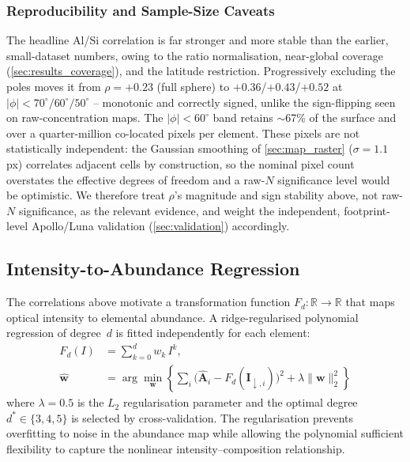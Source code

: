 \documentclass[journal,lettersize]{IEEEtran}
\begin{document}
\subsubsection{Reproducibility and Sample-Size Caveats}\label{sec:sr_correlation_caveat}

The headline Al/Si correlation is far stronger and more stable than the
earlier, small-dataset numbers, owing to the ratio normalisation,
near-global coverage (\cref{sec:results_coverage}), and the latitude
restriction. Progressively excluding the poles moves it from $\rho=+0.23$
(full sphere) to $+0.36$/$+0.43$/$+0.52$ at $|\phi|<70^{\circ}/60^{\circ}/50^{\circ}$
-- monotonic and correctly signed, unlike the sign-flipping seen on
raw-concentration maps. The $|\phi|<60^{\circ}$ band retains $\sim$67\%
of the surface and over a quarter-million co-located pixels per element.
These pixels are not statistically independent: the Gaussian
smoothing of \cref{sec:map_raster} ($\sigma=1.1$\,px) correlates
adjacent cells by construction, so the nominal pixel count overstates the
effective degrees of freedom and a raw-$N$ significance level would be
optimistic. We therefore treat $\rho$'s magnitude and sign stability
above, not raw-$N$ significance, as the relevant evidence, and weight the
independent, footprint-level Apollo/Luna validation
(\cref{sec:validation}) accordingly.

\subsection{Intensity-to-Abundance Regression}\label{sec:sr_regression}

The correlations above motivate a transformation function
$F_d : \mathbb{R} \to \mathbb{R}$ that maps optical intensity to
elemental abundance.  A ridge-regularised polynomial regression of
degree~$d$ is fitted independently for each element:
\begin{equation}\label{eq:poly_regression}
  \begin{aligned}
    F_d(I) &= \sum_{k=0}^{d} w_k\, I^k, \\
    \hat{\mathbf{w}} &= \arg\min_{\mathbf{w}}
      \left\{
        \sum_{i}\bigl(\hat{\mathbf{A}}_i - F_d(\mathbf{I}_{\downarrow,i})\bigr)^2
        + \lambda\|\mathbf{w}\|_2^2
      \right\}
  \end{aligned}
\end{equation}
where $\lambda = 0.5$ is the $L_2$ regularisation parameter and the
optimal degree $d^* \in \{3,4,5\}$ is selected by cross-validation.
The regularisation prevents overfitting to noise in the abundance map
while allowing the polynomial sufficient flexibility to capture the
nonlinear intensity--composition relationship.
\end{document}
